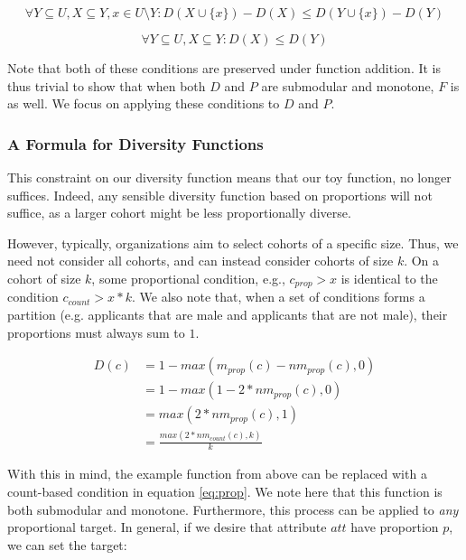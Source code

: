 \begin{equation}
    \label{eq:submodularity}
    \forall Y \subseteq U, X \subseteq Y, x \in U \setminus Y: D(X \cup \{x\}) - D(X) \leq D(Y \cup \{x\}) - D(Y)
\end{equation}

\begin{equation}
    \label{eq:mononicity}
    \forall Y \subseteq U, X \subseteq Y: D(X)\leq D(Y)
\end{equation}

Note that both of these conditions are preserved under function addition. It is thus trivial to show that when both $D$ and $P$ are submodular and monotone, $F$ is as well. We focus on applying these conditions to $D$ and $P$.

\subsubsection{A Formula for Diversity Functions}
This constraint on our diversity function means that our toy function, no longer suffices. Indeed, any sensible diversity function based on proportions will not suffice, as a larger cohort might be less proportionally diverse.

However, typically, organizations aim to select cohorts of a specific size. Thus, we need not consider all cohorts, and can instead consider cohorts of size $k$. On a cohort of size $k$, some proportional condition, e.g., $c_{prop} > x$ is identical to the condition $c_{count} > x*k$. We also note that, when a set of conditions forms a partition (e.g. applicants that are male and applicants that are not male), their proportions must always sum to $1$.

\begin{equation}
    \label{eq:prop}
    \begin{split}
        D(c) &= 1 - max(m_{prop}(c) - nm_{prop}(c), 0) \\
        &= 1 - max(1 - 2*nm_{prop}(c), 0) \\
        &= max(2*nm_{prop}(c), 1) \\
        &= \frac{max(2*nm_{count}(c), k)}{k}
    \end{split}
\end{equation}

With this in mind, the example function from above can be replaced with a count-based condition in equation \ref{eq:prop}. We note here that this function is both submodular and monotone. Furthermore, this process can be applied to \textit{any} proportional target. In general, if we desire that attribute $att$ have proportion $p$, we can set the target:

